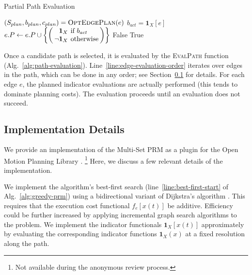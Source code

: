 \begin{algorithm}
\caption{Partial Path Evaluation}
\label{alg:path-evaluation}
\begin{algorithmic}[1]
         \label{line:edge-evaluation-order}
      \State $(S_{plan}, b_{plan}, c_{plan})
         = \mbox{\textsc{OptEdgePlan}}(e)$
         \State $b_{act} = \mathbf{1}_X[e]$
         \State $\arraycolsep=2pt
            e.P \leftarrow e.P \cup
            \left\{\left( \begin{array}{rl}
            \mathbf{1}_X & \mbox{if } b_{act} \\
            \lnot \mathbf{1}_X & \mbox{otherwise} \\
            \end{array} \right)
            \right\}$
            \State \Return False
         \EndIf
      \EndFor
   \EndFor
   \State \Return True
\EndFunction
\end{algorithmic}
\end{algorithm}

Once a candidate path is selected,
it is evaluated by the \textsc{EvalPath} function
(Alg.~\ref{alg:path-evaluation}).
Line~\ref{line:edge-evaluation-order} iterates over edges in
the path,
which can be done in any order;
see Section~\ref{subsec:implementation-details} for details.
For each edge $e$,
the planned indicator evaluations are actually performed
(this tends to dominate planning costs).
The evaluation proceeds until an evaluation does not succeed.

\subsection{Implementation Details}
\label{subsec:implementation-details}

We provide an implementation of the Multi-Set PRM
as a plugin for the Open Motion Planning Library \cite{sucan2012ompl}.%
\footnote{Not available during the anonymous review process.}
Here, we discuss a few relevant details of the implementation.

We implement the algorithm's best-first search 
(line~\ref{line:best-first-start} of Alg.~\ref{alg:greedy-prm})
using a bidirectional variant of Dijkstra's algorithm
\cite{dijkstra1959anote}.
This requires that the execution cost functional $f_e[x(t)]$
be additive.
Efficiency could be further increased by applying incremental
graph search algorithms \cite{koenig2004lpastar} to the problem.
We implement the indicator functionals $\mathbf{1}_X[x(t)]$
approximately by evaluating the corresponding indicator functions
$\mathbf{1}_X(x)$ at a fixed resolution along the path.

